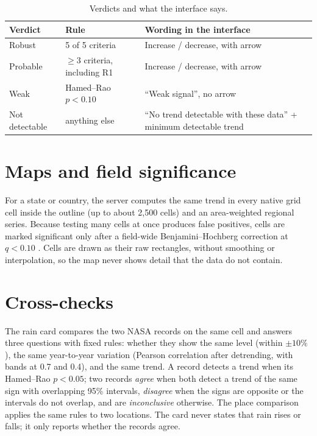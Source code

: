 \documentclass[12pt, oneside, openany]{report}
\begin{document}
\begin{table}[H]
\centering
\caption{Verdicts and what the interface says.}
\label{tab:verdicts}
\begin{tabularx}{\linewidth}{@{}llX@{}}
\toprule
\textbf{Verdict} & \textbf{Rule} & \textbf{Wording in the interface} \\
\midrule
Robust & 5 of 5 criteria & Increase / decrease, with arrow \\
Probable & $\geq 3$ criteria, including R1 & Increase / decrease, with arrow \\
Weak & Hamed--Rao $p < 0.10$ & \enquote{Weak signal}, no arrow \\
Not detectable & anything else & \enquote{No trend detectable with these data} + minimum detectable trend \\
\bottomrule
\end{tabularx}
\end{table}

\section{Maps and field significance}

For a state or country, the server computes the same trend in every native grid cell inside the outline (up to about 2,500 cells) and an area-weighted regional series. Because testing many cells at once produces false positives, cells are marked significant only after a field-wide Benjamini--Hochberg correction at $q < 0.10$ \cite{wilks2016}. Cells are drawn as their raw rectangles, without smoothing or interpolation, so the map never shows detail that the data do not contain.

\section{Cross-checks}

The rain card compares the two NASA records on the same cell and answers three questions with fixed rules: whether they show the same level (within $\pm 10\%$), the same year-to-year variation (Pearson correlation after detrending, with bands at 0.7 and 0.4), and the same trend. A record detects a trend when its Hamed--Rao $p < 0.05$; two records \emph{agree} when both detect a trend of the same sign with overlapping 95\% intervals, \emph{disagree} when the signs are opposite or the intervals do not overlap, and are \emph{inconclusive} otherwise. The place comparison applies the same rules to two locations. The card never states that rain rises or falls; it only reports whether the records agree.
\end{document}
